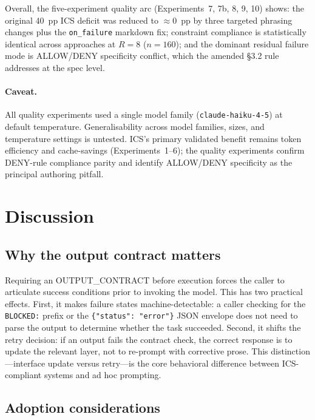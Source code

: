 \documentclass[11pt]{article}
\begin{document}
Overall, the five-experiment quality arc (Experiments~7, 7b, 8, 9, 10) shows:
the original 40~pp ICS deficit was reduced to $\approx$0~pp by three targeted
phrasing changes plus the \texttt{on\_failure} markdown fix; constraint compliance
is statistically identical across approaches at $R{=}8$ ($n{=}160$); and the
dominant residual failure mode is ALLOW/DENY specificity conflict, which the
amended §3.2 rule addresses at the spec level.

\paragraph{Caveat.}
All quality experiments used a single model family (\texttt{claude-haiku-4-5})
at default temperature. Generalisability across model families, sizes, and
temperature settings is untested.
ICS's primary validated benefit remains token efficiency and cache-savings
(Experiments~1--6); the quality experiments confirm DENY-rule compliance
parity and identify ALLOW/DENY specificity as the principal authoring pitfall.

\section{Discussion}
\label{sec:discussion}

\subsection{Why the output contract matters}
\label{sec:oc-discuss}

Requiring an OUTPUT\_CONTRACT before execution forces the caller to
articulate success conditions prior to invoking the model. This has two
practical effects. First, it makes failure states machine-detectable: a
caller checking for the \texttt{BLOCKED:} prefix or the
\texttt{\{"status": "error"\}} JSON envelope does not need to parse the
output to determine whether the task succeeded. Second, it shifts the retry
decision: if an output fails the contract check, the correct response is to
update the relevant layer, not to re-prompt with corrective prose. This
distinction---interface update versus retry---is the core behavioral
difference between ICS-compliant systems and ad hoc prompting.

\subsection{Adoption considerations}
\label{sec:adoption}
\end{document}
